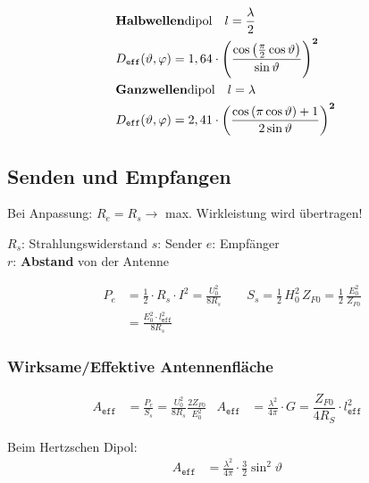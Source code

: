 \vspace{-0.5cm}
\begin{align*}
	                                                                                          & \text{\textbf{Halbwellen}dipol}\quad l=\frac{\lambda}{2} \\
	                                                                                          & D_{\texttt{eff}}(\vartheta, \varphi) = 1,64 \cdot
	\left(\frac{\cos\left(\frac{\pi}{2}\cos\vartheta\right)}{\sin\vartheta}\right)^\mathbf{2} &                                                          \\
	                                                                                          & \text{\textbf{Ganzwellen}dipol}\quad l=\lambda           \\ &D_{\texttt{eff}}(\vartheta, \varphi) = 2,41 \cdot
	\left(\frac{\cos\left(\pi\cos\vartheta\right)+1}{2\sin\vartheta}\right)^\mathbf{2}        &
\end{align*}

\newcolumn
\subsection{Senden und Empfangen}
Bei Anpassung: $R_e = R_s \rightarrow$ max. Wirkleistung wird übertragen!


$ R_s $: Strahlungswiderstand \quad $ s $: Sender \qquad $ e $: Empfänger\\
$ r $: \textbf{Abstand} von der Antenne

\begin{align*}
	P_e & = \frac{1}{2}\cdot R_s \cdot I^2 = \frac{U_0^2}{8R_{s}} \qquad S_s = \frac{1}{2}\, H_0^2 \, Z_{F0} = \frac{1}{2} \, \frac{E_0^2}{Z_{F0}} \\
	    & = \frac{E_0^2\cdot l^2_{\mathtt{eff}}}{8R_{s}}
\end{align*}

\subsubsection{Wirksame/Effektive Antennenfläche}
\begin{align*}
	A_\texttt{eff} & = \frac{P_e}{S_s} = \frac{U_0^2}{8R_{s}}\frac{2Z_{F0}}{E_0^2}                  &
	A_\texttt{eff} & = \frac{\lambda^2}{4\pi}\cdot G = \dfrac{Z_{F0}}{4 R_S} \cdot l_\texttt{eff}^2 &
\end{align*}

Beim Hertzschen Dipol:
\begin{align*}
	A_\texttt{eff} & =  \frac{\lambda^2}{4\pi}\cdot\frac{3}{2}\sin^2\vartheta &
\end{align*}

